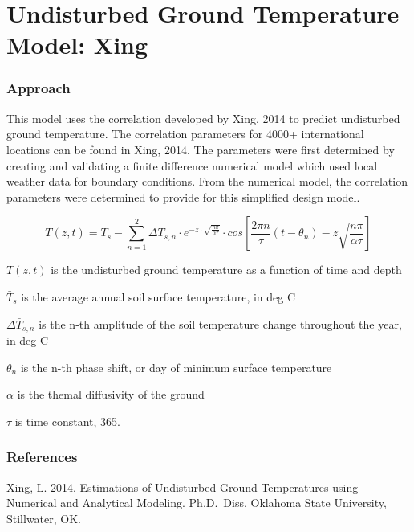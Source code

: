 \section{Undisturbed Ground Temperature Model: Xing}\label{undisturbed-ground-temperature-model-xing}

\subsubsection{Approach}\label{approach-005}

This model uses the correlation developed by Xing, 2014 to predict undisturbed ground temperature. The correlation parameters for 4000+ international locations can be found in Xing, 2014. The parameters were first determined by creating and validating a finite difference numerical model which used local weather data for boundary conditions. From the numerical model, the correlation parameters were determined to provide for this simplified design model.

\begin{equation}
T(z,t) = \bar{T}_{s} - \sum_{n = 1}^{2} \Delta\bar{T}_{s,n} \cdot e^{-z \cdot \sqrt{\frac{n\pi}{\alpha\tau}}} \cdot cos\left[ \frac{2 \pi n}{\tau} \left(t - \theta_{n} \right) - z \sqrt{\frac{n \pi}{\alpha \tau}} \right]
\end{equation}

\(T(z,t)\) is the undisturbed ground temperature as a function of time and depth

\(\bar{T}_{s}\) is the average annual soil surface temperature, in deg C

\(\Delta\bar{T}_{s,n}\) is the n-th amplitude of the soil temperature change throughout the year, in deg C

\(\theta_{n}\) is the n-th phase shift, or day of minimum surface temperature

\(\alpha\) is the themal diffusivity of the ground

\(\tau\) is time constant, 365.

\subsubsection{References}\label{references-050}

Xing, L. 2014. Estimations of Undisturbed Ground Temperatures using Numerical and Analytical Modeling. Ph.D.~Diss. Oklahoma State University, Stillwater, OK.
